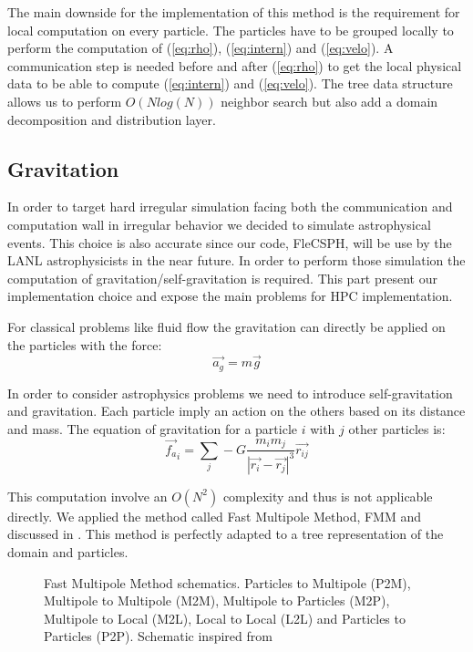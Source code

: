 The main downside for the implementation of this method is the requirement for local computation on every particle. 
The particles have to be grouped locally to perform the computation of (\ref{eq:rho}), (\ref{eq:intern}) and (\ref{eq:velo}).
A communication step is needed before and after (\ref{eq:rho}) to get the local physical data to be able to compute (\ref{eq:intern}) and (\ref{eq:velo}).
The tree data structure allows us to perform $O(Nlog(N))$ neighbor search but also add a domain decomposition and distribution layer.

\subsection{Gravitation}
In order to target hard irregular simulation facing both the communication and computation wall in irregular behavior we decided to simulate astrophysical events. 
This choice is also accurate since our code, FleCSPH, will be use by the LANL astrophysicists in the near future. 
In order to perform those simulation the computation of gravitation/self-gravitation is required. 
This part present our implementation choice and expose the main problems for HPC implementation. 


For classical problems like fluid flow the gravitation can directly be applied on the particles with the force:
\begin{equation}
	\vec{a_g} = m\vec{g}
\end{equation}

In order to consider astrophysics problems we need to introduce self-gravitation and gravitation. 
Each particle imply an action on the others based on its distance and mass. 
The equation of gravitation for a particle $i$ with $j$ other particles is: 
\begin{equation}
	\vec{f_a}_i = \sum_j -G \frac{m_i m_j}{|\vec{r_i}-\vec{r_j}|^3} \vec{r_{ij}}
	\label{eq:gravitation}
\end{equation}

This computation involve an $O(N^2)$ complexity and thus is not applicable directly. 
We applied the method called Fast Multipole Method, FMM and discussed in \cite{beatson1997short}.
This method is perfectly adapted to a tree representation of the domain and particles. 

\begin{figure}[ht!]

\caption{Fast Multipole Method schematics. Particles to Multipole (P2M), Multipole to Multipole (M2M), Multipole to Particles (M2P), Multipole to Local (M2L), Local to Local (L2L) and Particles to Particles (P2P). Schematic inspired from \cite{yokota2011treecode}}
\label{fig:gravitation_fmm}
\end{figure}

